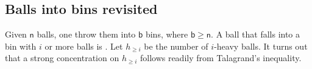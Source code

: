 \newcommand{\nballs}{\mathsf{n}}%
\newcommand{\nbins}{\mathsf{b}}%
\newcommand{\NHX}[1]{h_{\geq #1}}


\subsection{Balls into bins revisited}

Given $\nballs$ balls, one throw them into $\nbins$ bins, where
$\nbins \geq \nballs$.  A ball that falls into a bin with $i$ or more
balls is .  Let $\NHX{i}$ be the number of $i$-heavy
balls. It turns out that a strong concentration on $\NHX{i}$ follows
readily from Talagrand's inequality.


